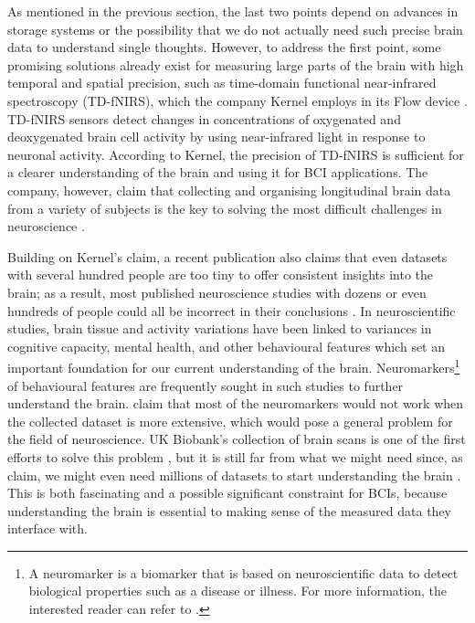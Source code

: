 As mentioned in the previous section, the last two points depend on advances in storage systems or the possibility that we do not actually need such precise brain data to understand single thoughts. However, to address the first point, some promising solutions already exist for measuring large parts of the brain with high temporal and spatial precision, such as time-domain functional near-infrared spectroscopy (TD-fNIRS), which the company Kernel employs in its Flow device \citep{ban_kernel_2021}. TD-fNIRS sensors detect changes in concentrations of oxygenated and deoxygenated brain cell activity by using near-infrared light in response to neuronal activity. According to Kernel, the precision of TD-fNIRS is sufficient for a clearer understanding of the brain and using it for BCI applications. The company, however, claim that collecting and organising longitudinal brain data from a variety of subjects is the key to solving the most difficult challenges in neuroscience \citep{kernel_hello-humanitypdf_nodate}.

Building on Kernel’s claim, a recent publication also claims that even datasets with several hundred people are too tiny to offer consistent insights into the brain; as a result, most published neuroscience studies with dozens or even hundreds of people could all be incorrect in their conclusions \citep{marek_reproducible_2022}. In neuroscientific studies, brain tissue and activity variations have been linked to variances in cognitive capacity, mental health, and other behavioural features which set an important foundation for our current understanding of the brain. Neuromarkers\footnote{A neuromarker is a biomarker that is based on neuroscientific data to detect biological properties such as a disease or illness. For more information, the interested reader can refer to \citeauthor{jollans_neuromarkers_2018} \parencite*{jollans_neuromarkers_2018}.} of behavioural features are frequently sought in such studies to further understand the brain. \citeauthor{marek_reproducible_2022} \parencite*{marek_reproducible_2022} claim that most of the neuromarkers would not work when the collected dataset is more extensive, which would pose a general problem for the field of neuroscience. UK Biobank’s collection of brain scans is one of the first efforts to solve this problem \citep{noauthor_imaging_nodate}, but it is still far from what we might need since, as \citeauthor{marek_reproducible_2022} \parencite*{marek_reproducible_2022} claim, we might even need millions of datasets to start understanding the brain \citep{callaway_can_2022}. This is both fascinating and a possible significant constraint for BCIs, because understanding the brain is essential to making sense of the measured data they interface with.


